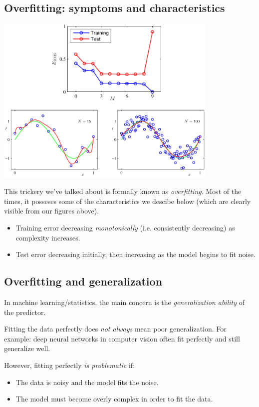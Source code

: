 \subsection*{Overfitting: symptoms and characteristics}
\includegraphics[width=0.8\textwidth]{figures/overfitting_training_test.png}

This trickery we've talked about is formally known as \textit{overfitting}. Most of the times, it posseses some of the characteristics we descibe below (which are clearly visible from our figures above).
\begin{itemize}
    \item Training error decreasing \textit{monotonically} (i.e. consistently decreasing) as complexity increases.
    \item Test error decreasing initially, then increasing as the model begins to fit noise.
\end{itemize}

\subsection*{Overfitting and generalization}
In machine learning/statistics, the main concern is the \emph{generalization ability} of the predictor.

\medskip

\noindent Fitting the data perfectly does \emph{not always} mean poor generalization.  
For example: deep neural networks in computer vision often fit perfectly and still generalize well.

\medskip

\noindent However, fitting perfectly \emph{is problematic} if:
\begin{itemize}
    \item The data is noisy and the model fits the noise.
    \item The model must become overly complex in order to fit the data.
\end{itemize}


